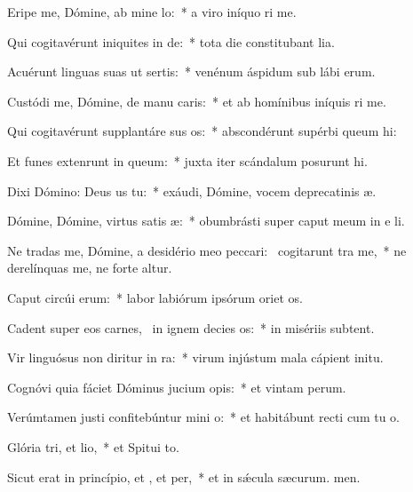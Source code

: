 \item Eripe me, Dómine, ab mine lo:~* a viro iníquo ri me.
\item Qui cogitavérunt iniquites in de:~* tota die constitubant lia.
\item Acuérunt linguas suas ut sertis:~* venénum áspidum sub lábi erum.
\item Custódi me, Dómine, de manu caris:~* et ab homínibus iníquis ri me.
\item Qui cogitavérunt supplantáre sus os:~* abscondérunt supérbi queum hi:
\item Et funes extenrunt in queum:~* juxta iter scándalum posurunt hi.
\item Dixi Dómino: Deus us  tu:~* exáudi, Dómine, vocem deprecatinis æ.
\item Dómine, Dómine, virtus satis æ:~* obumbrásti super caput meum in e li.
\item Ne tradas me, Dómine, a desidério meo peccari:~\pscross{} cogitarunt tra me,~* ne derelínquas me, ne forte altur.
\item Caput circúi erum:~* labor labiórum ipsórum oriet os.
\item Cadent super eos carnes,~\pscross{} in ignem decies os:~* in misériis  subtent.
\item Vir linguósus non diritur in ra:~* virum injústum mala cápient  initu.
\item Cognóvi quia fáciet Dóminus jucium opis:~* et vintam perum.
\item Verúmtamen justi confitebúntur mini o:~* et habitábunt recti cum tu o.
\item Glória tri, et lio,~* et Spitui to.
\item Sicut erat in princípio, et , et per,~* et in sǽcula sæcurum. men.
